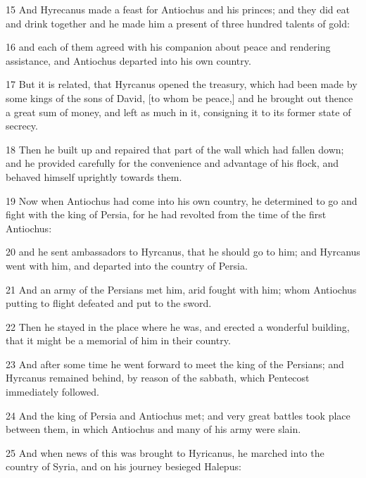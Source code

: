 \par 15 And Hyrecanus made a feast for Antiochus and his princes; and they did eat and drink together and he made him a present of three hundred talents of gold: 

\par 16 and each of them agreed with his companion about peace and rendering assistance, and Antiochus departed into his own country. 

\par 17 But it is related, that Hyrcanus opened the treasury, which had been made by some kings of the sons of David, [to whom be peace,] and he brought out thence a great sum of money, and left as much in it, consigning it to its former state of secrecy. 

\par 18 Then he built up and repaired that part of the wall which had fallen down; and he provided carefully for the convenience and advantage of his flock, and behaved himself uprightly towards them. 

\par 19 Now when Antiochus had come into his own country, he determined to go and fight with the king of Persia, for he had revolted from the time of the first Antiochus: 

\par 20 and he sent ambassadors to Hyrcanus, that he should go to him; and Hyrcanus went with him, and departed into the country of Persia. 

\par 21 And an army of the Persians met him, arid fought with him; whom Antiochus putting to flight defeated and put to the sword. 

\par 22 Then he stayed in the place where he was, and erected a wonderful building, that it might be a memorial of him in their country. 

\par 23 And after some time he went forward to meet the king of the Persians; and Hyrcanus remained behind, by reason of the sabbath, which Pentecost immediately followed. 

\par 24 And the king of Persia and Antiochus met; and very great battles took place between them, in which Antiochus and many of his army were slain. 

\par 25 And when news of this was brought to Hyricanus, he marched into the country of Syria, and on his journey besieged Halepus: 

